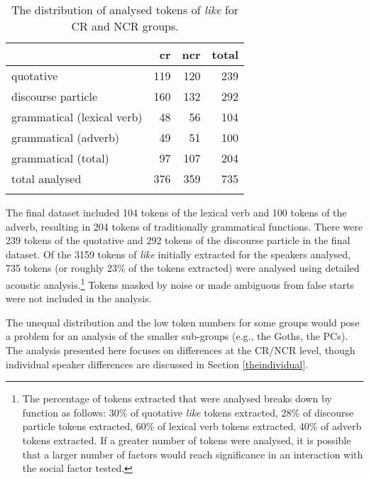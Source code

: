 \begin{table}[htbp]
\caption{The distribution of analysed tokens of \textit{like} for CR and NCR groups.}
  \label{tab:tokensanalysed}
	 \begin{center}
		\begin{tabular}{lrrr}\lsptoprule
	
		& \sc cr 	&	 \sc ncr & \sc total \\
              
  \midrule
  
quotative & 119 & 120 & 239 \\
discourse particle & 160 & 132 & 292 \\
grammatical (lexical verb) & 48 & 56 & 104\\
grammatical (adverb) & 49  & 51 & 100 \\
grammatical (total) & 97 & 107 & 204 \\
total analysed      & 376 & 359 & 735 \\

\lspbottomrule
		\end{tabular}
	
	\end{center}
\end{table}

The final dataset included 104 tokens of the lexical verb and 100 tokens of the adverb, resulting in 204 tokens of traditionally grammatical functions.  There were 239 tokens of the quotative and 292 tokens of the discourse particle in the final dataset.  Of the 3159 tokens of \textit{like} initially extracted for the speakers analysed, 735 tokens (or roughly	23\% of the tokens extracted) were analysed using detailed acoustic analysis.\footnote{The percentage of tokens extracted that were analysed breaks down by function as follows: 30\% of quotative \textit{like} tokens extracted, 28\% of discourse particle tokens extracted, 60\% of lexical verb tokens extracted, 40\% of adverb tokens extracted.  If a greater number of tokens were analysed, it is possible that a larger number of factors would reach significance in an interaction with the social factor tested.}  Tokens masked by noise or made ambiguous from false starts were not included in the analysis.  

The unequal distribution and the low token numbers for some groups would pose a problem for an analysis of the smaller sub-groups (e.g., the Goths, the PCs).  The analysis presented here focuses on differences at the CR/NCR level, though individual speaker differences are discussed in Section \ref{theindividual}.   

